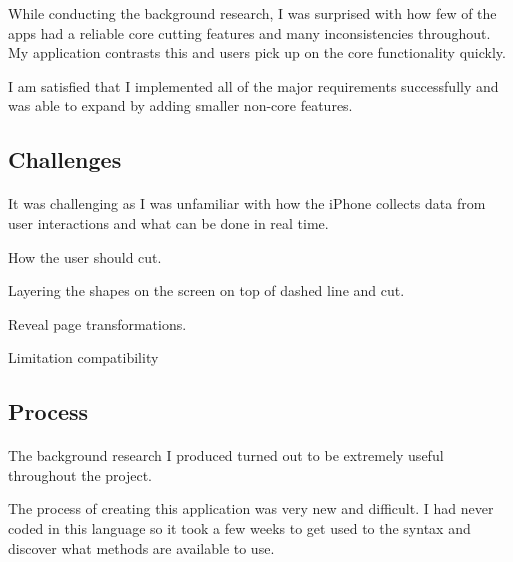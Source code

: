 \documentclass[11pt]{article}
\begin{document}
        While conducting the background research, I was surprised with how few of the apps had a reliable core cutting features and many inconsistencies throughout. My application contrasts this and users pick up on the core functionality quickly.
        
        I am satisfied that I implemented all of the major requirements successfully and was able to expand by adding smaller non-core features.
        
    \subsection{Challenges}
    
        \paragraph{}
        It was challenging as I was unfamiliar with how the iPhone collects data from user interactions and what can be done in real time. 
        
        How the user should cut. 
        
        Layering the shapes on the screen on top of dashed line and cut.
        
        Reveal page transformations. 
        
        Limitation 
        compatibility
        
            \subsection{Process}
            \paragraph{}
            The background research I produced turned out to be extremely useful throughout the project.
            
            The process of creating this application was very new and difficult. I had never coded in this language so it took a few weeks to get used to the syntax and discover what methods are available to use. 
            
                            

            
\end{document}
